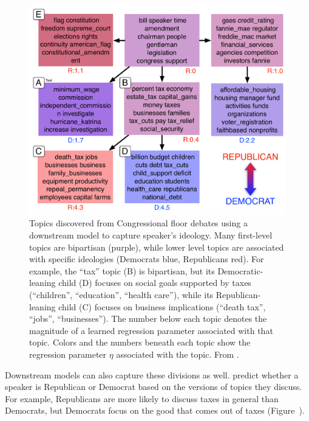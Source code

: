 \begin{figure}[ht]
  \begin{minipage}[c]{0.62\textwidth}
  	\vspace{-.3cm}
    \includegraphics[width=\textwidth]{figures/ideology_topics_vert}
  \end{minipage}\hfill
  \begin{minipage}[c]{0.36\textwidth}
    \caption{
       \small Topics discovered from Congressional floor debates using
       a downstream model to capture speaker's ideology.  Many
    first-level topics are bipartisan (purple), while lower level topics are
    associated with specific ideologies (Democrats blue, Republicans red). For example,
    	the ``tax'' topic (B) is bipartisan, but its Democratic-leaning child (D) focuses on
    	social goals supported by taxes (``children'', ``education'', ``health care''), while
    	its Republican-leaning child (C) focuses on business implications (``death tax'', ``jobs'',
    	``businesses'').  The number below each
    topic denotes the magnitude of a learned regression parameter associated
    with that topic.  Colors and the numbers beneath each topic show the
    regression parameter $\eta$ associated with the topic.  From \citet{nguyen-13:shlda}.
    } \label{fig:shlda-taxes}
  \end{minipage}
  \vspace{-.3cm}
\end{figure}


Downstream models can also capture these divisions as well.
\citet{nguyen-13:shlda} predict whether a speaker is Republican or
Democrat based on the versions of topics they discuss.  For example,
Republicans are more likely to discuss taxes in general than
Democrats, but Democrats focus on the good that comes out of taxes
(Figure~\cite{fig:shlda-taxes}).

